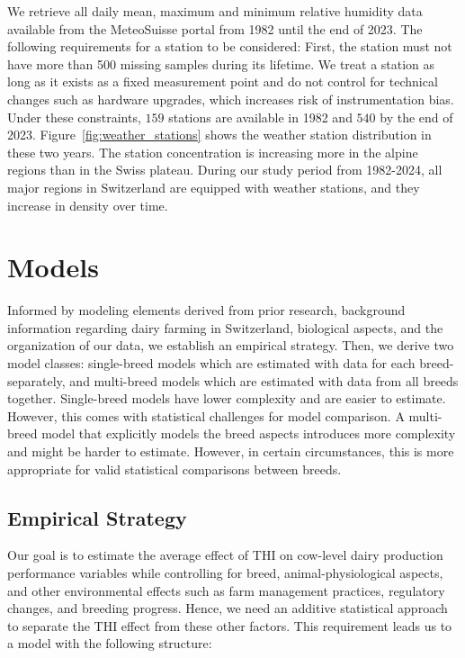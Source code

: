We retrieve all daily mean, maximum and minimum relative humidity data available from the MeteoSuisse portal from 1982 until the end of 2023. The following requirements for a station to be considered: First, the station must not have more than 500 missing samples during its lifetime. We treat a station as long as it exists as a fixed measurement point and do not control for technical changes such as hardware upgrades, which increases risk of instrumentation bias. Under these constraints, $159$ stations are available in 1982 and $540$ by the end of 2023. Figure~\ref{fig:weather_stations} shows the weather station distribution in these two years. The station concentration is increasing more in the alpine regions than in the Swiss plateau. During our study period from 1982-2024, all major regions in Switzerland are equipped with weather stations, and they increase in density over time.


\section{Models}\label{sec:models}
Informed by modeling elements derived from prior research, background information regarding dairy farming in Switzerland, biological aspects, and the organization of our data, we establish an empirical strategy. Then, we derive two model classes: single-breed models which are estimated with data for each breed-separately, and multi-breed models which are estimated with data from all breeds together. Single-breed models have lower complexity and are easier to estimate. However, this comes with statistical challenges for model comparison. A multi-breed model that explicitly models the breed aspects introduces more complexity and might be harder to estimate. However, in certain circumstances, this is more appropriate for valid statistical comparisons between breeds.

\subsection{Empirical Strategy}\label{sec:empirical_strategy}
Our goal is to estimate the average effect of THI on cow-level dairy production performance variables while controlling for breed, animal-physiological aspects, and other environmental effects such as farm management practices, regulatory changes, and breeding progress. Hence, we need an additive statistical approach to separate the THI effect from these other factors. This requirement leads us to a model with the following structure:

